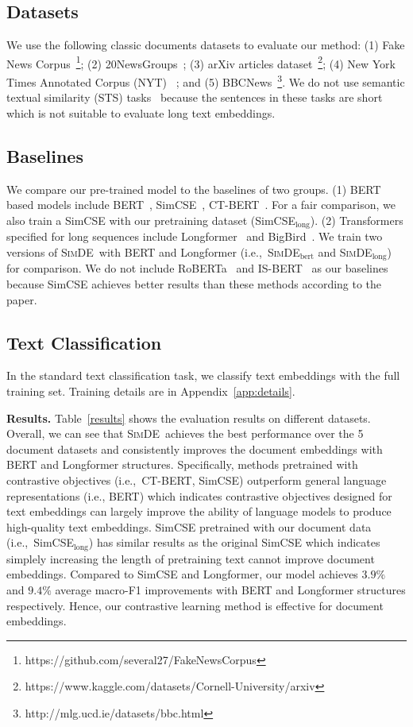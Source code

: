 \documentclass[11pt]{article}
\newcommand{\our}{\mbox{\textsc{SimDE}}}
\begin{document}
\subsection{Datasets}
We use the following classic documents datasets to evaluate our method:
(1) Fake News Corpus~\footnote{https://github.com/several27/FakeNewsCorpus};
(2) 20NewsGroups~\cite{Lang1995NewsWeederLT};
(3) arXiv articles dataset~\footnote{https://www.kaggle.com/datasets/Cornell-University/arxiv};
(4) New York Times Annotated Corpus (NYT) ~\cite{sandhaus2008new}; and
(5) BBCNews~\footnote{http://mlg.ucd.ie/datasets/bbc.html}.
We do not use semantic textual similarity (STS) tasks~\cite{Agirre2012SemEval2012T6} because the sentences in these tasks are short which is not suitable to evaluate long text embeddings.

\subsection{Baselines}
We compare our pre-trained model to the baselines of two groups.
(1) BERT based models include BERT~\cite{Devlin2019BERTPO}, SimCSE~\cite{Gao2021SimCSESC}, CT-BERT~\cite{Carlsson2021SemanticRW}. For a fair comparison, we also train a SimCSE with our pretraining dataset (SimCSE$_\mathrm{long}$).
(2) Transformers specified for long sequences include Longformer~\cite{Beltagy2020LongformerTL} and BigBird~\cite{Zaheer2020BigBT}.
We train two versions of \our~with BERT and Longformer (i.e.,~\our$_\mathrm{bert}$ and \our$_{\mathrm{long}}$) for comparison.
We do not include RoBERTa~\cite{Liu2019RoBERTaAR} and IS-BERT~\cite{Zhang2020AnUS} as our baselines because SimCSE achieves better results than these methods according to the paper.

\subsection{Text Classification}
In the standard text classification task, we classify text embeddings with the full training set. 
Training details are in Appendix~\ref{app:details}.

\textbf{Results.}
Table~\ref{results} shows the evaluation results on different datasets. 
Overall, we can see that \our~achieves the best performance over the 5 document datasets and consistently improves the document embeddings with BERT and Longformer structures. 
Specifically, methods pretrained with contrastive objectives (i.e.,~CT-BERT, SimCSE) outperform general language representations (i.e., BERT) which indicates contrastive objectives designed for text embeddings can largely improve the ability of language models to produce high-quality text embeddings. SimCSE pretrained with our document data (i.e.,~SimCSE$_{\mathrm{long}}$) has similar results as the original SimCSE which indicates simplely increasing the length of pretraining text cannot improve document embeddings.
Compared to SimCSE and Longformer, our model achieves $3.9\%$ and $9.4\%$ average macro-F1 improvements with BERT and Longformer structures respectively. Hence, our contrastive learning method is effective for document embeddings.
\end{document}
